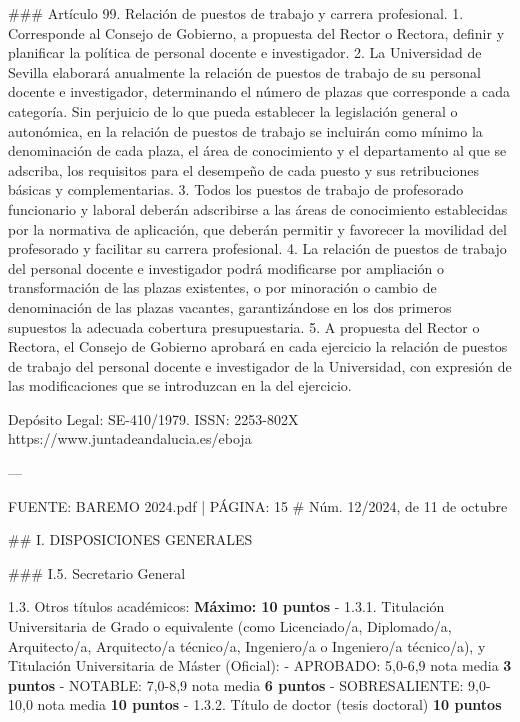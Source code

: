 \documentclass{article}
\begin{document}
\begin{itemize}
\begin{itemize}
\begin{scriptsize}
                  \#\#\# Artículo 99. Relación de puestos de trabajo y carrera profesional.
                  1. Corresponde al Consejo de Gobierno, a propuesta del Rector o Rectora, definir y planificar la política de personal docente e investigador.
                  2. La Universidad de Sevilla elaborará anualmente la relación de puestos de trabajo de su personal docente e investigador, determinando el número de plazas que corresponde a cada categoría. Sin perjuicio de lo que pueda establecer la legislación general o autonómica, en la relación de puestos de trabajo se incluirán como mínimo la denominación de cada plaza, el área de conocimiento y el departamento al que se adscriba, los requisitos para el desempeño de cada puesto y sus retribuciones básicas y complementarias.
                  3. Todos los puestos de trabajo de profesorado funcionario y laboral deberán adscribirse a las áreas de conocimiento establecidas por la normativa de aplicación, que deberán permitir y favorecer la movilidad del profesorado y facilitar su carrera profesional.
                  4. La relación de puestos de trabajo del personal docente e investigador podrá modificarse por ampliación o transformación de las plazas existentes, o por minoración o cambio de denominación de las plazas vacantes, garantizándose en los dos primeros supuestos la adecuada cobertura presupuestaria.
                  5. A propuesta del Rector o Rectora, el Consejo de Gobierno aprobará en cada ejercicio la relación de puestos de trabajo del personal docente e investigador de la Universidad, con expresión de las modificaciones que se introduzcan en la del ejercicio.

                  Depósito Legal: SE-410/1979. ISSN: 2253-802X
                  https://www.juntadeandalucia.es/eboja

                  ---

                  FUENTE: BAREMO 2024.pdf | PÁGINA: 15
                  \# Núm. 12/2024, de 11 de octubre

                  \#\# I. DISPOSICIONES GENERALES

                  \#\#\# I.5. Secretario General

                  1.3. Otros títulos académicos:                                                            \textbf{Máximo: 10 puntos}
                  - 1.3.1. Titulación Universitaria de Grado o equivalente (como Licenciado/a, Diplomado/a, Arquitecto/a, Arquitecto/a técnico/a, Ingeniero/a o Ingeniero/a técnico/a), y Titulación Universitaria de Máster (Oficial):
                  - APROBADO: 5,0-6,9 nota media                            \textbf{3 puntos}
                  - NOTABLE: 7,0-8,9 nota media                             \textbf{6 puntos}
                  - SOBRESALIENTE: 9,0-10,0 nota media                      \textbf{10 puntos}
                  - 1.3.2. Título de doctor (tesis doctoral)                  \textbf{10 puntos}


\end{scriptsize}
\end{itemize}
\end{itemize}
\end{document}
